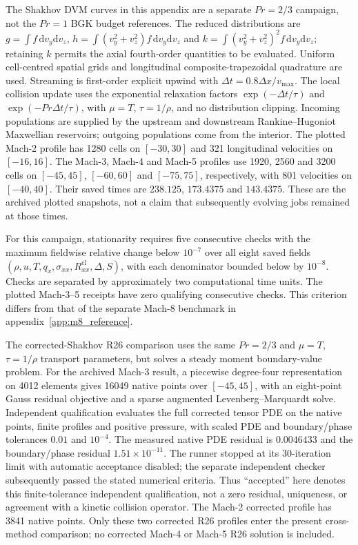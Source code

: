 \documentclass[lineno,paper]{JFM-FLM_Au}
\newenvironment{revision}{\begingroup\colorlet{shadecolor}{revisionyellow}\begin{shaded}}{\end{shaded}\endgroup}
\newenvironment{revision}{}{}
\newcommand{\dd}{\mathrm{d}}
\newcommand{\cl}{\mathrm{cl}}
\begin{document}
\begin{revision}
The Shakhov DVM curves in this appendix are a separate $Pr=2/3$ campaign, not the $Pr=1$ BGK budget references. The reduced distributions are $g=\int f\,\dd v_y\dd v_z$, $h=\int(v_y^2+v_z^2)f\,\dd v_y\dd v_z$ and $k=\int(v_y^2+v_z^2)^2f\,\dd v_y\dd v_z$; retaining $k$ permits the axial fourth-order quantities to be evaluated. Uniform cell-centred spatial grids and longitudinal composite-trapezoidal quadrature are used. Streaming is first-order explicit upwind with $\Delta t=0.8\Delta x/v_{\max}$. The local collision update uses the exponential relaxation factors $\exp(-\Delta t/\tau)$ and $\exp(-Pr\Delta t/\tau)$, with $\mu=T$, $\tau=1/\rho$, and no distribution clipping. Incoming populations are supplied by the upstream and downstream Rankine--Hugoniot Maxwellian reservoirs; outgoing populations come from the interior. The plotted Mach-2 profile has 1280 cells on $[-30,30]$ and 321 longitudinal velocities on $[-16,16]$. The Mach-3, Mach-4 and Mach-5 profiles use 1920, 2560 and 3200 cells on $[-45,45]$, $[-60,60]$ and $[-75,75]$, respectively, with 801 velocities on $[-40,40]$. Their saved times are $238.125$, $173.4375$ and $143.4375$. These are the archived plotted snapshots, not a claim that subsequently evolving jobs remained at those times.

For this campaign, stationarity requires five consecutive checks with the maximum fieldwise relative change below $10^{-7}$ over all eight saved fields $(\rho,u,T,q_x,\sigma_{xx},R^{\cl}_{xx},\Delta,S)$, with each denominator bounded below by $10^{-8}$. Checks are separated by approximately two computational time units. The plotted Mach-3--5 receipts have zero qualifying consecutive checks. This criterion differs from that of the separate Mach-8 benchmark in appendix~\ref{app:m8_reference}.

The corrected-Shakhov R26 comparison uses the same $Pr=2/3$ and $\mu=T$, $\tau=1/\rho$ transport parameters, but solves a steady moment boundary-value problem. For the archived Mach-3 result, a piecewise degree-four representation on 4012 elements gives 16049 native points over $[-45,45]$, with an eight-point Gauss residual objective and a sparse augmented Levenberg--Marquardt solve. Independent qualification evaluates the full corrected tensor PDE on the native points, finite profiles and positive pressure, with scaled PDE and boundary/phase tolerances $0.01$ and $10^{-4}$. The measured native PDE residual is $0.0046433$ and the boundary/phase residual $1.51\times10^{-11}$. The runner stopped at its 30-iteration limit with automatic acceptance disabled; the separate independent checker subsequently passed the stated numerical criteria. Thus ``accepted'' here denotes this finite-tolerance independent qualification, not a zero residual, uniqueness, or agreement with a kinetic collision operator. The Mach-2 corrected profile has 3841 native points. Only these two corrected R26 profiles enter the present cross-method comparison; no corrected Mach-4 or Mach-5 R26 solution is included.
\end{revision}
\end{document}
